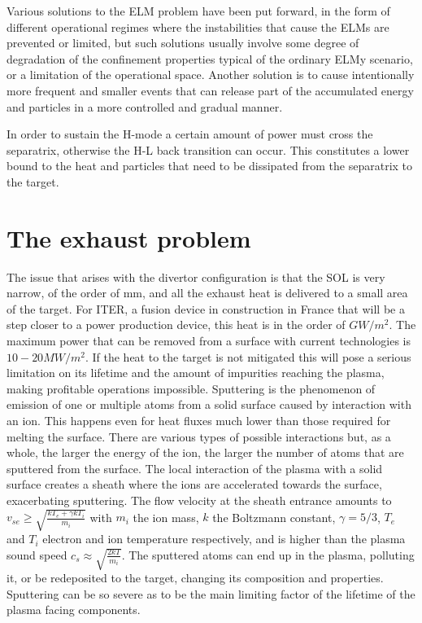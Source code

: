 Various solutions to the ELM problem have been put forward, in the form of different operational regimes where the instabilities that cause the ELMs are prevented or limited, but such solutions usually involve some degree of degradation of the confinement properties typical of the ordinary ELMy scenario, or a limitation of the operational space. Another solution is to 
cause intentionally more frequent and smaller events that can release part of the accumulated energy and particles in a more controlled and gradual manner.\cite{Leonard2014}

In order to sustain the H-mode a certain amount of power must cross the separatrix, otherwise the H-L back transition can occur. This constitutes a lower bound to the heat and particles that need to be dissipated from the separatrix to the target.

\section{The exhaust problem}

The issue that arises with the divertor configuration is that the SOL is very narrow, of the order of mm\cite{Faitsch2021,Silvagni2020}, and all the exhaust heat is delivered to a small area of the target. For ITER, a fusion device in construction in France that will be a step closer to a power production device, this heat is in the order of $GW/m^2$.\cite{Kuang2020} The maximum power that can be removed from a surface with current technologies is $10-20MW/m^2$.\cite{Pitts2019,Lipschultz2018} If the heat to the target is not mitigated this will pose a serious limitation on its lifetime and the amount of impurities reaching the plasma, making profitable operations impossible. 
Sputtering is the phenomenon of emission of one or multiple atoms from a solid surface caused by interaction with an ion. This happens even for heat fluxes much lower than those required for melting the surface.\cite{Wiesen2017a} There are various types of possible interactions but, as a whole, the larger the energy of the ion, the larger the number of atoms that are sputtered from the surface. The local interaction of the plasma with a solid surface creates a sheath where the ions are accelerated towards the surface, exacerbating sputtering. The flow velocity at the sheath entrance amounts to $v_{se} \geq \sqrt{\frac{kT_e + \gamma kT_i}{m_i}}$ with $m_i$ the ion mass, $k$ the Boltzmann constant, $\gamma=5/3$, $T_e$ and $T_i$ electron and ion temperature respectively, and is higher than the plasma sound speed $c_s \approx \sqrt{\frac{2kT}{m_i}}$. The sputtered atoms can end up in the plasma, polluting it, or be redeposited to the target, changing its composition and properties. Sputtering can be so severe as to be the main limiting factor of the lifetime of the plasma facing components.

